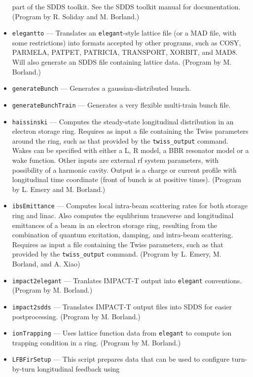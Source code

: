 \documentclass[11pt]{article}
\begin{document}
\begin{itemize}
        part of the SDDS toolkit.  See the SDDS toolkit
        manual for documentation. (Program by R. Soliday and M. Borland.)
\item {\tt elegantto} --- Translates an {\tt elegant}-style lattice file (or a MAD file, with
        some restrictions) into formats accepted by other programs, such as COSY, PARMELA, 
        PATPET, PATRICIA, TRANSPORT, XORBIT, and MAD8.  Will also generate an SDDS file containing lattice
        data.  (Program by M. Borland.)
\item {\tt generateBunch} --- Generates a gaussian-distributed bunch.
\item {\tt generateBunchTrain} --- Generates a very flexible multi-train bunch file.
\item {\tt haissinski} --- Computes the steady-state longitudinal distribution in
        an electron storage ring.  Requires as input a file containing the Twiss
        parameters around the ring, such as that provided by the \verb|twiss_output| command.
        Wakes can be specified with either a L, R model, a BBR resonator model or a wake function.
        Other inputs are external rf system parameters, with possibility of a harmonic
        cavity. Output is a charge or current profile with longitudinal time coordinate (front
        of bunch is at positive times). 
        (Program by L. Emery and M. Borland.)
\item {\tt ibsEmittance} --- Computes local intra-beam scattering rates for both storage ring
        and linac. Also computes the equlibrium transverse and longitudinal emittances of a 
        beam in an electron storage ring, resulting from the combination of quantum excitation,
        damping, and intra-beam scattering.  Requires as input a file containing the
        Twiss parameters, such as that provided by the \verb|twiss_output| command.
        (Program by L. Emery, M. Borland, and A. Xiao)
\item {\tt impact2elegant} --- Tranlates IMPACT-T \cite{IMPACT} output into {\tt elegant} conventions.
  (Program by M. Borland.)
\item {\tt impact2sdds} --- Translates IMPACT-T output files into SDDS for easier postprocessing.
  (Program by M. Borland.)
\item {\tt ionTrapping} --- Uses lattice function data from {\tt elegant} to compute ion trapping condition in
  a ring. (Program by M. Borland.)
\item {\tt LFBFirSetup} --- This script prepares data that can be used to configure turn-by-turn longitudinal feedback using

\end{itemize}
\end{document}
